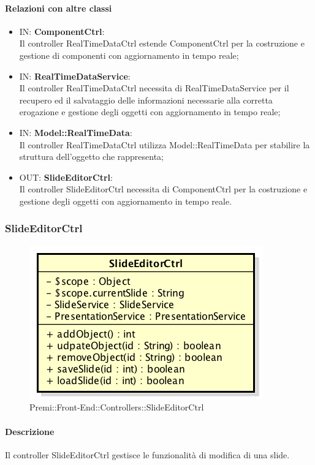 \paragraph{Relazioni con altre classi}
\begin{itemize}
	\item IN: \textbf{ComponentCtrl}:\\
	Il controller RealTimeDataCtrl estende ComponentCtrl per la costruzione e gestione di componenti con aggiornamento in tempo reale;
	\item IN: \textbf{RealTimeDataService}:\\
	Il controller RealTimeDataCtrl necessita di RealTimeDataService per il recupero ed il salvataggio delle informazioni necessarie alla corretta erogazione e gestione degli oggetti con aggiornamento in tempo reale;
	\item IN: \textbf{Model::RealTimeData}:\\
	Il controller RealTimeDataCtrl utilizza Model::RealTimeData per stabilire la struttura dell'oggetto che rappresenta;
	
	\item OUT: \textbf{SlideEditorCtrl}:\\
	Il controller SlideEditorCtrl necessita di ComponentCtrl per la costruzione e gestione degli oggetti con aggiornamento in tempo reale.
\end{itemize}

\newpage


\subsubsection{SlideEditorCtrl}
\begin{figure}[h]
	\centering
	\includegraphics[width=0.5\linewidth]{img/premi_front_end_controllers_slideeditorctrl}
	\caption[Premi::Front-End::Controllers::SlideEditorCtrl]{Premi::Front-End::Controllers::SlideEditorCtrl}
\end{figure}
	\paragraph{Descrizione}
	Il controller SlideEditorCtrl gestisce le funzionalità di modifica di una slide.

